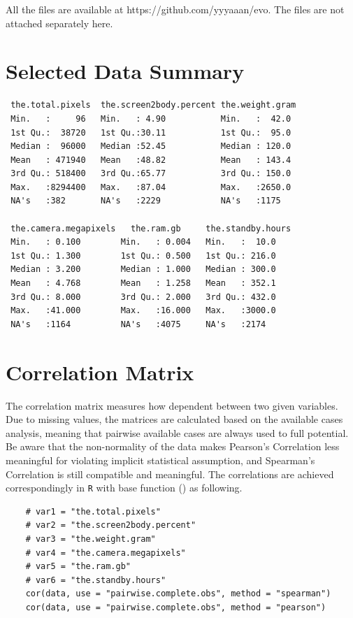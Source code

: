 \documentclass[utf8,english]{gradu3}
\begin{document}
All the files are available at https://github.com/yyyaaan/evo. The files are not attached separately here.

\section{Selected Data Summary}
\label{app:data summary}
\begin{verbatim}
 the.total.pixels  the.screen2body.percent the.weight.gram 
 Min.   :     96   Min.   : 4.90           Min.   :  42.0  
 1st Qu.:  38720   1st Qu.:30.11           1st Qu.:  95.0  
 Median :  96000   Median :52.45           Median : 120.0  
 Mean   : 471940   Mean   :48.82           Mean   : 143.4  
 3rd Qu.: 518400   3rd Qu.:65.77           3rd Qu.: 150.0  
 Max.   :8294400   Max.   :87.04           Max.   :2650.0  
 NA's   :382       NA's   :2229            NA's   :1175    
 
 the.camera.megapixels   the.ram.gb     the.standby.hours
 Min.   : 0.100        Min.   : 0.004   Min.   :  10.0   
 1st Qu.: 1.300        1st Qu.: 0.500   1st Qu.: 216.0   
 Median : 3.200        Median : 1.000   Median : 300.0   
 Mean   : 4.768        Mean   : 1.258   Mean   : 352.1   
 3rd Qu.: 8.000        3rd Qu.: 2.000   3rd Qu.: 432.0   
 Max.   :41.000        Max.   :16.000   Max.   :3000.0   
 NA's   :1164          NA's   :4075     NA's   :2174     
\end{verbatim}


\section{Correlation Matrix}
\label{app:corr}

The correlation matrix measures how dependent between two given variables. Due to missing values, the matrices are calculated based on the available cases analysis, meaning that pairwise available cases are always used to full potential. Be aware that the non-normality of the data makes Pearson's Correlation less meaningful for violating implicit statistical assumption, and Spearman's Correlation is still compatible and meaningful. The correlations are achieved correspondingly in \texttt{R} with base function (\cite{RBase}) as following.

\begin{verbatim}
    # var1 = "the.total.pixels"
    # var2 = "the.screen2body.percent"
    # var3 = "the.weight.gram"
    # var4 = "the.camera.megapixels"
    # var5 = "the.ram.gb"
    # var6 = "the.standby.hours"
    cor(data, use = "pairwise.complete.obs", method = "spearman")
    cor(data, use = "pairwise.complete.obs", method = "pearson")
\end{verbatim}
\end{document}
